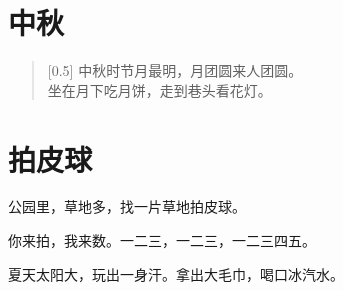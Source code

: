\documentclass[12pt,UTF-8,openany]{ctexbook}
\begin{document}
\hanzibox{}\hanzibox{}\hanzibox{}\hanzibox{}\hspace{1em}\hanzibox{}\hanzibox{}\hanzibox{}\hanzibox{}

\hanzibox{}\hanzibox{}\hanzibox{}\hanzibox{}\hspace{1em}




\chapter{中秋}

\begin{large}
    
    \begin{verse}[0.5\linewidth]
        中秋时节月最明，月团圆来人团圆。 \\
        坐在月下吃月饼，走到巷头看花灯。
    \end{verse}
    
\end{large}


\clearpage

\begin{center}
    
\end{center}


\hanzibox{}\hanzibox{}\hanzibox{}\hanzibox{}\hspace{1em}\hanzibox{}\hanzibox{}\hanzibox{}\hanzibox{}

\hanzibox{}\hanzibox{}\hanzibox{}\hanzibox{}\hspace{1em}\hanzibox{}\hanzibox{}\hanzibox{}\hanzibox{}

\hanzibox{}\hanzibox{}\hanzibox{}\hanzibox{}\hspace{1em}\hanzibox{}\hanzibox{}\hanzibox{}\hanzibox{}






\chapter{拍皮球}

\begin{large}
    
    公园里，草地多，找一片草地拍皮球。
    
    你来拍，我来数。一二三，一二三，一二三四五。
    
    夏天太阳大，玩出一身汗。拿出大毛巾，喝口冰汽水。
    
\end{large}
\end{document}
